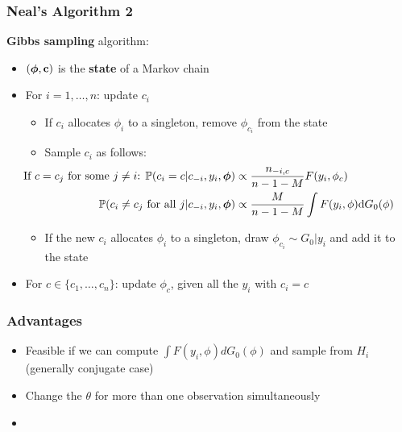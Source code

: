 \begin{frame} %
	\frametitle{Neal's Algorithm 2}
	\textbf{Gibbs sampling} algorithm:
	\begin{itemize}
		\item $(\boldsymbol\phi, \textbf c)$ is the \textbf{state} of a Markov chain
	    \item For $i= 1,\dots,n$: update $c_{i}$
	    \begin{itemize}
	        \item If $c_{i}$ allocates $\phi_i$ to a singleton, remove $\phi_{c_{i}}$ from the state
		    \item Sample $c_i$ as follows:
	        \begin{align*}
		        \hspace{-35pt}
                \text{If $c=c_j$ for some $j\neq i$: } \PP(c_{i}=c | c_{-i}, y_{i},\boldsymbol\phi) &\propto \frac{n_{-i,c}}{n-1-M} F(y_{i},\phi_{c}) \\
                \PP(c_{i}\neq c_{j} \text{ for all } j | c_{-i}, y_{i},\boldsymbol\phi) &\propto \frac{M }{n-1-M} \int F(y_{i},\phi) \de G_{0}(\phi)
            \end{align*}
            \pause
            \item If the new $c_{i}$ allocates $\phi_i$ to a singleton, draw $\phi_{c_{i}} \sim G_0|y_i$ and add it to the state %
        \end{itemize} 
        
       	\item For $c \in \{c_{1},\dots,c_{n}\}$: update $\phi_{c}$, given all the $y_{i}$ with $c_{i}=c$
	\end{itemize}
		
\end{frame}


\begin{frame} %
	\frametitle{Advantages}
	\begin{itemize}
	    \item Feasible if we can compute $\int F(y_{i},\phi)dG_{0}(\phi)$ and sample from $H_{i}$ (generally conjugate case)
	    \item Change the $\theta$ for more than one observation simultaneously
	    \item %
	\end{itemize}
\end{frame}


